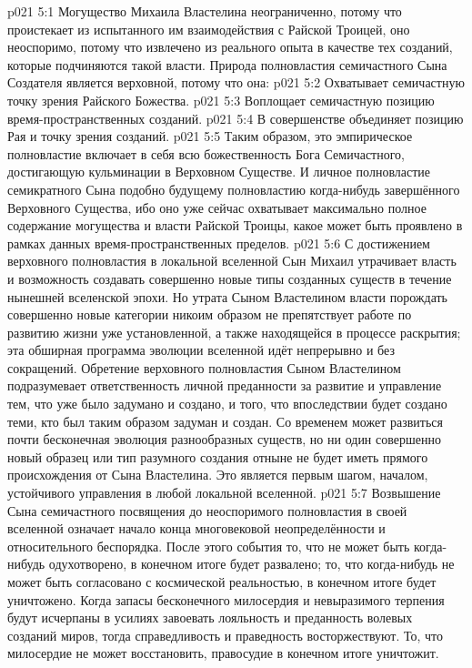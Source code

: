 \vs p021 5:1 Могущество Михаила Властелина неограниченно, потому что проистекает из испытанного им взаимодействия с Райской Троицей, оно неоспоримо, потому что извлечено из реального опыта в качестве тех созданий, которые подчиняются такой власти. Природа полновластия семичастного Сына Создателя является верховной, потому что она:
\vs p021 5:2 Охватывает семичастную точку зрения Райского Божества.
\vs p021 5:3 Воплощает семичастную позицию время\hyp{}пространственных созданий.
\vs p021 5:4 В совершенстве объединяет позицию Рая и точку зрения созданий.
\vs p021 5:5 \pc Таким образом, это эмпирическое полновластие включает в себя всю божественность Бога Семичастного, достигающую кульминации в Верховном Существе. И личное полновластие семикратного Сына подобно будущему полновластию когда\hyp{}нибудь завершённого Верховного Существа, ибо оно уже сейчас охватывает максимально полное содержание могущества и власти Райской Троицы, какое может быть проявлено в рамках данных время\hyp{}пространственных пределов.
\vs p021 5:6 \pc С достижением верховного полновластия в локальной вселенной Сын Михаил утрачивает власть и возможность создавать совершенно новые типы созданных существ в течение нынешней вселенской эпохи. Но утрата Сыном Властелином власти порождать совершенно новые категории никоим образом не препятствует работе по развитию жизни уже установленной, а также находящейся в процессе раскрытия; эта обширная программа эволюции вселенной идёт непрерывно и без сокращений. Обретение верховного полновластия Сыном Властелином подразумевает ответственность личной преданности за развитие и управление тем, что уже было задумано и создано, и того, что впоследствии будет создано теми, кто был таким образом задуман и создан. Со временем может развиться почти бесконечная эволюция разнообразных существ, но ни один совершенно новый образец или тип разумного создания отныне не будет иметь прямого происхождения от Сына Властелина. Это является первым шагом, началом, устойчивого управления в любой локальной вселенной.
\vs p021 5:7 Возвышение Сына семичастного посвящения до неоспоримого полновластия в своей вселенной означает начало конца многовековой неопределённости и относительного беспорядка. После этого события то, что не может быть когда\hyp{}нибудь одухотворено, в конечном итоге будет развалено; то, что когда\hyp{}нибудь не может быть согласовано с космической реальностью, в конечном итоге будет уничтожено. Когда запасы бесконечного милосердия и невыразимого терпения будут исчерпаны в усилиях завоевать лояльность и преданность волевых созданий миров, тогда справедливость и праведность восторжествуют. То, что милосердие не может восстановить, правосудие в конечном итоге уничтожит.
